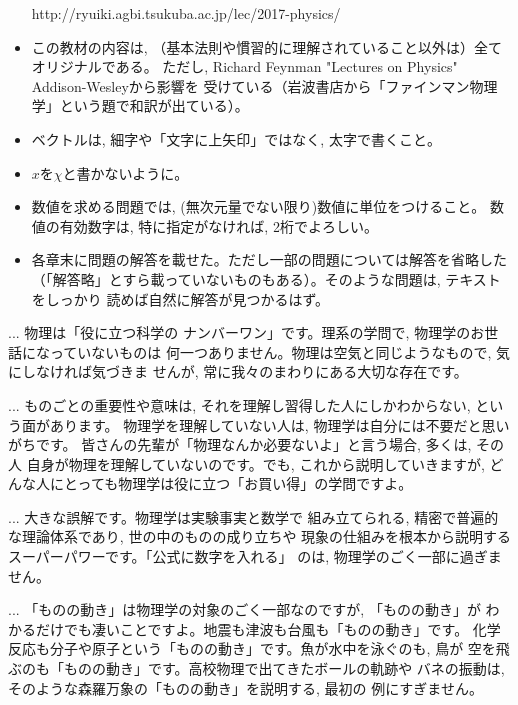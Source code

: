 \begin{itemize}
http://ryuiki.agbi.tsukuba.ac.jp/lec/2017-physics/
\item この教材の内容は, （基本法則や慣習的に理解されていること以外は）全てオリジナルである。
ただし, Richard Feynman "Lectures on Physics" Addison-Wesleyから影響を
受けている（岩波書店から「ファインマン物理学」という題で和訳が出ている）。
\item ベクトルは, 細字や「文字に上矢印」ではなく, 太字で書くこと。
\item $x$を$\chi$と書かないように。
\item 数値を求める問題では, (無次元量でない限り)数値に単位をつけること。
数値の有効数字は, 特に指定がなければ, 2桁でよろしい。
\item 各章末に問題の解答を載せた。ただし一部の問題については解答を省略した
（「解答略」とすら載っていないものもある）。そのような問題は, テキストをしっかり
読めば自然に解答が見つかるはず。
\end{itemize}
\mv

\begin{faq}{\small{} ... 物理は「役に立つ科学の
ナンバーワン」です。理系の学問で, 物理学のお世話になっていないものは
何一つありません。物理は空気と同じようなもので, 気にしなければ気づきま
せんが, 常に我々のまわりにある大切な存在です。}\end{faq}

\begin{faq}{\small{} ... ものごとの重要性や意味は, 
それを理解し習得した人にしかわからない, という面があります。
物理学を理解していない人は, 物理学は自分には不要だと思いがちです。
皆さんの先輩が「物理なんか必要ないよ」と言う場合, 多くは, その人
自身が物理を理解していないのです。でも, これから説明していきますが, 
どんな人にとっても物理学は役に立つ「お買い得」の学問ですよ。}\end{faq}

\begin{faq}{\small{} ... 大きな誤解です。物理学は実験事実と数学で
組み立てられる, 精密で普遍的な理論体系であり, 世の中のものの成り立ちや
現象の仕組みを根本から説明するスーパーパワーです。「公式に数字を入れる」
のは, 物理学のごく一部に過ぎません。}\end{faq}

\begin{faq}{\small{}
 ... 「ものの動き」は物理学の対象のごく一部なのですが, 「ものの動き」が
わかるだけでも凄いことですよ。地震も津波も台風も「ものの動き」です。
化学反応も分子や原子という「ものの動き」です。魚が水中を泳ぐのも, 鳥が
空を飛ぶのも「ものの動き」です。高校物理で出てきたボールの軌跡や
バネの振動は, そのような森羅万象の「ものの動き」を説明する, 最初の
例にすぎません。}\end{faq}


